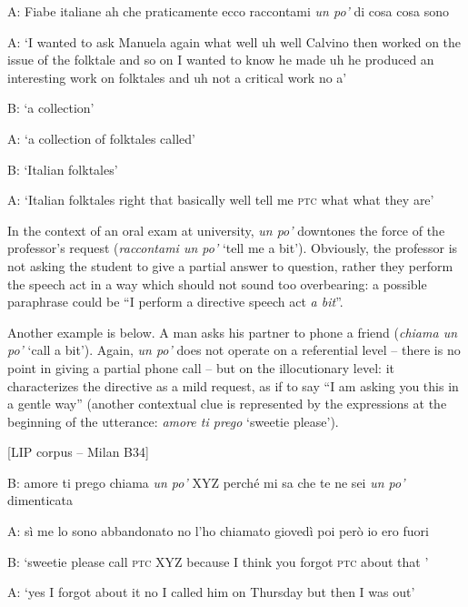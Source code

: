 A:   Fiabe italiane ah che praticamente ecco raccontami \textit{un po’} di cosa cosa sono

\glt
A:  ‘I wanted to ask Manuela again what well uh well Calvino then worked on the issue of the folktale and so on I wanted to know he made uh he produced an interesting work on folktales and uh not a critical work no a’

B:  ‘a collection’

A:  ‘a collection of folktales called’

B:  ‘Italian folktales’

A:  ‘Italian folktales right that basically well tell me \textsc{ptc} what what they are’
    \z %

In the context of an oral exam at university, \textit{un po’} downtones the force of the professor’s request (\textit{raccontami un po’} ‘tell me a bit’). Obviously, the professor is not asking the student to give a partial answer to question, rather they perform the speech act in a way which should not sound too overbearing: a possible paraphrase could be “I perform a directive speech act \textit{a bit}”.

Another example is  below. A man asks his partner to phone a friend (\textit{chiama un po’} ‘call a bit’). Again, \textit{un po’} does not operate on a referential level – there is no point in giving a partial phone call – but on the illocutionary level: it characterizes the directive as a mild request, as if to say “I am asking you this in a gentle way” (another contextual clue is represented by the expressions at the beginning of the utterance: \textit{amore ti prego} ‘sweetie please’).

\newpage
\ea%
    \label{ex:key:70}

          [LIP corpus – Milan B34]

B:   amore ti prego chiama \textit{un po’} XYZ perché mi sa che te ne sei \textit{un po’} dimenticata

A:   sì me lo sono abbandonato no l’ho chiamato giovedì poi però io ero fuori

\glt
B:  ‘sweetie please call \textsc{ptc} XYZ because I think you forgot \textsc{ptc} about that ’

A:  ‘yes I forgot about it no I called him on Thursday but then I was out’
    \z %

